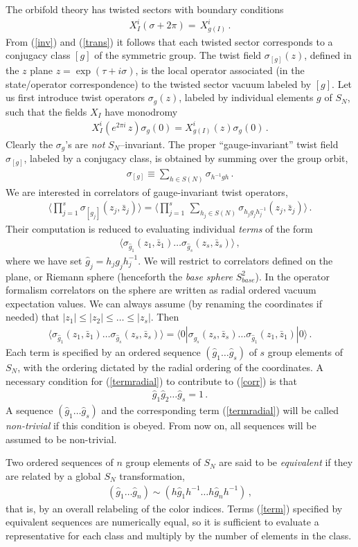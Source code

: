 \documentclass[letterpaper]{JHEP3}
\def\s{\sigma}
\def\be{\begin{equation}}
\def\ee{\end{equation}}
\def\be{\begin{eqnarray}}
\def\ee{\end{eqnarray}}
\begin{document}
The orbifold theory has twisted sectors with boundary conditions
\be\label{trans}
X^i_I(\s+2\pi)=\,X^i_{g(I)} \,.
\ee
From (\ref{inv}) and (\ref{trans}) it follows
 that each twisted sector corresponds to a conjugacy class  $[g]$ of the symmetric group.
 The twist field $\sigma_{[g]} (z)$, defined  in the $z$ plane $z=\exp(\tau+i \s)$,
 is  the local operator associated (in the state/operator correspondence) to
  the twisted sector vacuum labeled by $[g]$.
 Let us first introduce twist operators $\s_g(z)$, labeled by individual elements $g$ of $S_N$, 
such that the fields $X_I$ have monodromy
\be
X^i_I(e^{2\pi i}\,z)\s_g(0)= X^i_{g(I)}( z)\s_g(0) \,.
\ee
Clearly the $\s_g$'s are {\it not} $S_N$--invariant.  The proper 
``gauge-invariant''  twist field $\s_{[g]}$, labeled by a conjugacy class,
is obtained by  summing over the group orbit,
\be  \label{gaugeinvariant}
\s_{[g]} \equiv
\sum_{h\in S(N)}\s_{h^{-1}gh} \, .
\ee
We are  interested in correlators of gauge-invariant twist operators,
\be\label{corr}
\langle\prod_{j=1}^{s} \s_{[g_j]} (z_j, \bar z_j) \rangle=
\langle \prod_{j=1}^s \, \sum_{h_j\in S(N)} \s_{h_jg_jh_j^{-1}} (z_j, \bar z_j) \rangle \, .
\ee
Their computation is reduced to evaluating individual {\it terms} of the form
\be \label{term}
\langle   \s_{\hat g_1}  (z_1, \bar z_1)  \dots \s_{\hat g_s} (z_s, \bar z_s)\rangle \, ,
\ee
where we have set $\hat g_j=h_jg_jh_j^{-1}$. We will restrict to correlators
defined on the plane, or Riemann sphere (henceforth the {\it base sphere} $S^2_{base}$).
 In the operator formalism  correlators on the sphere are written as radial ordered vacuum expectation values.
We can always assume (by renaming  the coordinates if needed) that $|z_1 |  \leq |z_2|  \leq  \dots \leq |z_s|$. 
Then
\be \label{termradial}
\langle   \s_{\hat g_1}  (z_1, \bar z_1)  \dots \s_{\hat g_s} (z_s, \bar z_s)\rangle  = 
\langle 0 |  \s_{\hat g_s}  (z_s, \bar z_s)  \dots \s_{\hat g_1} (z_1, \bar z_1)  | 0 \rangle \,.
\ee
Each term is specified by an ordered sequence $(\hat g_1 \dots \hat g_s)$
of  $s$ group elements of $S_N$, with the ordering dictated by the radial
ordering of the coordinates. A necessary condition
for (\ref{termradial}) to contribute to (\ref{corr}) is that 
\be\label{nontrivcond}
\hat g_1 \hat g_2 \dots \hat g_s = 1 \,.
\ee
A sequence $(\hat g_1 \dots \hat g_s)$ and the corresponding term (\ref{termradial}) will be called {\it non-trivial} if this condition is obeyed.
From now on, all sequences will be assumed to be non-trivial.

Two ordered sequences of $n$ group elements of $S_N$ are said to be {\it equivalent}
if they are related by a global $S_N$ transformation,
\be \label{equrelation}
 ( \hat g_1    \dots \hat g_n  )  \sim   ( h \hat g_1 h^{-1}    \dots  h \hat g_n h^{-1}  ) \,  ,
\ee
that is, by an overall relabeling of the color indices.
Terms (\ref{term}) specified by equivalent sequences are numerically equal, so it is sufficient to evaluate a representative for each class
and multiply by the number of elements in the class.
\end{document}
